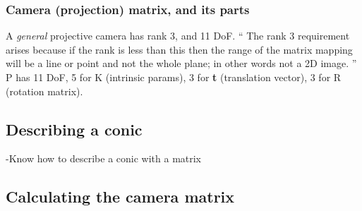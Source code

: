 \subsubsection{Camera (projection) matrix, and its parts}
A \textit{general} projective camera has rank 3, and 11 DoF.
``
The rank 3 requirement arises because if the rank is less
than this then the range of the matrix mapping will be a
line or point and not the whole plane; in other words not
a 2D image.
''
P has 11 DoF, 5 for K (intrinsic params), 3 for \textbf{t} (translation
vector), 3 for R (rotation matrix).


\subsection{Describing a conic}

-Know how to describe a conic with a matrix


\subsection{Calculating the camera matrix}

